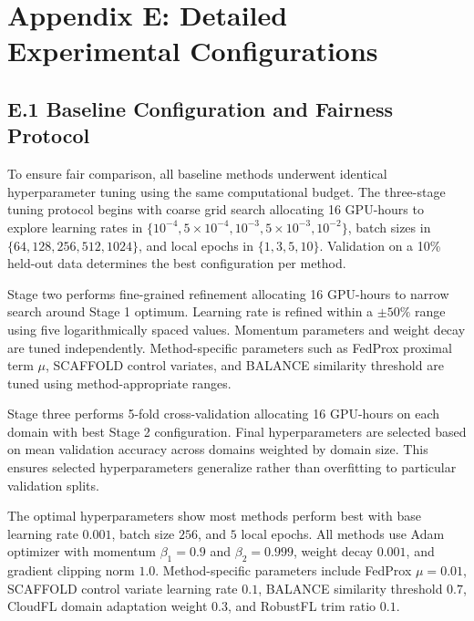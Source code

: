 \documentclass[12pt,a4paper]{article}
\theoremstyle{definition}
\begin{document}
\section{Appendix E: Detailed Experimental Configurations}

\subsection{E.1 Baseline Configuration and Fairness Protocol}

To ensure fair comparison, all baseline methods underwent identical hyperparameter tuning using the same computational budget. The three-stage tuning protocol begins with coarse grid search allocating 16 GPU-hours to explore learning rates in $\{10^{-4}, 5{\times}10^{-4}, 10^{-3}, 5{\times}10^{-3}, 10^{-2}\}$, batch sizes in $\{64, 128, 256, 512, 1024\}$, and local epochs in $\{1, 3, 5, 10\}$. Validation on a 10\% held-out data determines the best configuration per method.

Stage two performs fine-grained refinement allocating 16 GPU-hours to narrow search around Stage 1 optimum. Learning rate is refined within a $\pm 50\%$ range using five logarithmically spaced values. Momentum parameters and weight decay are tuned independently. Method-specific parameters such as FedProx proximal term $\mu$, SCAFFOLD control variates, and BALANCE similarity threshold are tuned using method-appropriate ranges.

Stage three performs 5-fold cross-validation allocating 16 GPU-hours on each domain with best Stage 2 configuration. Final hyperparameters are selected based on mean validation accuracy across domains weighted by domain size. This ensures selected hyperparameters generalize rather than overfitting to particular validation splits.

\begingroup
\setlength{\emergencystretch}{2em}

The optimal hyperparameters show most methods perform best with base learning rate \(0.001\), batch size \(256\), and \(5\) local epochs. All methods use Adam optimizer with momentum \(\beta_{1}=0.9\) and \(\beta_{2}=0.999\), weight decay \(0.001\), and gradient clipping norm \(1.0\). Method-specific parameters include FedProx \(\mu=0.01\), SCAFFOLD control variate learning rate \(0.1\), BALANCE similarity threshold \(0.7\), CloudFL domain adaptation weight \(0.3\), and RobustFL trim ratio \(0.1\).

\par\endgroup
\end{document}
